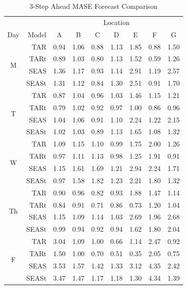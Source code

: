 \begin{table}[htbp]
\scriptsize
\centering
\caption{3-Step Ahead MASE Forecast Comparison}
\begin{tabular}{c|rccccccc}
  \hline
    & & \multicolumn{7}{c}{Location}\\
  \cline{5-7}
Day & Model & A & B & C & D & E & F & G \\ 
  \hline
  \multirow{4}{*}{M} & TAR & 0.94 & 1.06 & 0.88 & 1.13 & 1.85 & 0.88 & 1.50 \\ 
   & TARt & 0.89 & 1.03 & 0.80 & 1.13 & 1.52 & 0.59 & 1.26 \\ 
   & SEAS & 1.36 & 1.17 & 0.93 & 1.14 & 2.91 & 1.19 & 2.57 \\ 
   & SEASt & 1.31 & 1.12 & 0.84 & 1.30 & 2.51 & 0.91 & 1.70 \\ 
   \hline
  \multirow{4}{*}{T} & TAR & 0.87 & 1.04 & 0.96 & 1.03 & 1.46 & 1.15 & 1.21 \\ 
   & TARt & 0.79 & 1.02 & 0.92 & 0.97 & 1.00 & 0.86 & 0.96 \\ 
   & SEAS & 1.04 & 1.06 & 0.91 & 1.10 & 2.24 & 1.22 & 2.15 \\ 
   & SEASt & 1.02 & 1.03 & 0.89 & 1.13 & 1.65 & 1.08 & 1.32 \\
   \hline 
  \multirow{4}{*}{W} & TAR & 1.09 & 1.15 & 1.10 & 0.99 & 1.75 & 2.00 & 1.26 \\ 
   & TARt & 0.97 & 1.11 & 1.13 & 0.98 & 1.25 & 1.91 & 0.91 \\ 
   & SEAS & 1.15 & 1.61 & 1.69 & 1.21 & 2.94 & 2.24 & 1.71 \\ 
   & SEASt & 0.97 & 1.58 & 1.82 & 1.23 & 2.21 & 1.80 & 1.32 \\ 
   \hline
 \multirow{4}{*}{Th}  & TAR & 0.90 & 0.96 & 0.82 & 0.93 & 1.88 & 1.47 & 1.14 \\ 
   & TARt & 0.84 & 0.91 & 0.71 & 0.86 & 0.73 & 1.20 & 1.04 \\ 
   & SEAS & 1.15 & 1.09 & 1.14 & 1.03 & 2.69 & 1.96 & 2.68 \\ 
   & SEASt & 0.99 & 0.94 & 0.92 & 0.94 & 1.62 & 1.80 & 2.04 \\ 
  \hline
  \multirow{4}{*}{F} & TAR & 3.04 & 1.09 & 1.00 & 0.66 & 1.14 & 2.47 & 0.92 \\ 
   & TARt & 1.50 & 1.00 & 0.70 & 0.51 & 0.35 & 2.05 & 0.75 \\ 
   & SEAS & 3.53 & 1.57 & 1.42 & 1.33 & 3.12 & 4.35 & 2.42 \\ 
   & SEASt & 3.47 & 1.47 & 1.17 & 1.18 & 1.30 & 4.34 & 1.39 \\ 
   \hline
\end{tabular}
\label{ref:trafficmase3}
\end{table}

